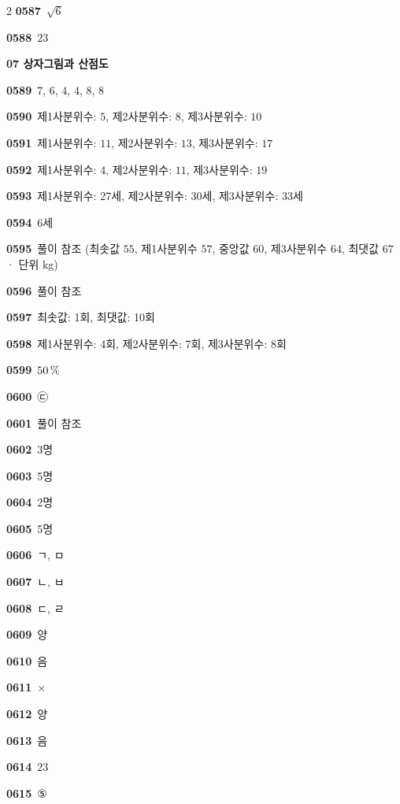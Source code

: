 \documentclass[10pt,a4paper]{article}
\begin{document}
\begin{multicols}{2}
\noindent\textbf{0587}\ $\sqrt{6}$\par
\noindent\textbf{0588}\ $23$\par
\noindent\textbf{07 상자그림과 산점도}\par\smallskip
\noindent\textbf{0589}\ $7$, $6$, $4$, $4$, $8$, $8$\par
\noindent\textbf{0590}\ 제1사분위수: $5$, 제2사분위수: $8$, 제3사분위수: $10$\par
\noindent\textbf{0591}\ 제1사분위수: $11$, 제2사분위수: $13$, 제3사분위수: $17$\par
\noindent\textbf{0592}\ 제1사분위수: $4$, 제2사분위수: $11$, 제3사분위수: $19$\par
\noindent\textbf{0593}\ 제1사분위수: 27세, 제2사분위수: 30세, 제3사분위수: 33세\par
\noindent\textbf{0594}\ 6세\par
\noindent\textbf{0595}\ 풀이 참조 (최솟값 $55$, 제1사분위수 $57$, 중앙값 $60$, 제3사분위수 $64$, 최댓값 $67$ · 단위 kg)\par
\noindent\textbf{0596}\ 풀이 참조\par
\noindent\textbf{0597}\ 최솟값: 1회, 최댓값: 10회\par
\noindent\textbf{0598}\ 제1사분위수: 4회, 제2사분위수: 7회, 제3사분위수: 8회\par
\noindent\textbf{0599}\ $50\mkern3mu \%$\par
\noindent\textbf{0600}\ ㉢\par
\noindent\textbf{0601}\ 풀이 참조\par
\noindent\textbf{0602}\ 3명\par
\noindent\textbf{0603}\ 5명\par
\noindent\textbf{0604}\ 2명\par
\noindent\textbf{0605}\ 5명\par
\noindent\textbf{0606}\ ㄱ, ㅁ\par
\noindent\textbf{0607}\ ㄴ, ㅂ\par
\noindent\textbf{0608}\ ㄷ, ㄹ\par
\noindent\textbf{0609}\ 양\par
\noindent\textbf{0610}\ 음\par
\noindent\textbf{0611}\ $\times$\par
\noindent\textbf{0612}\ 양\par
\noindent\textbf{0613}\ 음\par
\noindent\textbf{0614}\ $23$\par
\noindent\textbf{0615}\ ⑤\par

\end{multicols}
\end{document}
